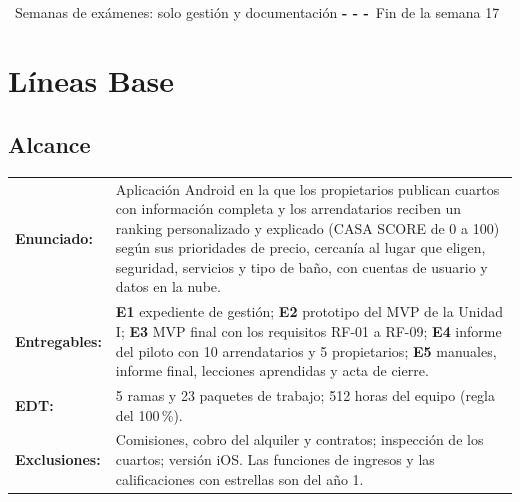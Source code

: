\documentclass[11pt,a4paper]{article}
\begin{document}
\begin{center}
\\[2pt]
{\scriptsize {}~Semanas de exámenes: solo gestión y documentación \quad \textcolor{RaciR}{\textbf{- - -}}~Fin de la semana 17}
\end{center}

\section{Líneas Base}
\subsection{Alcance}
{\small
\noindent\begin{tabularx}{\textwidth}{@{}P{3.0cm} L@{}}
\toprule
\textbf{Enunciado:} & Aplicación Android en la que los propietarios publican cuartos con información completa y los arrendatarios reciben un ranking personalizado y explicado (CASA SCORE de 0 a 100) según sus prioridades de precio, cercanía al lugar que eligen, seguridad, servicios y tipo de baño, con cuentas de usuario y datos en la nube. \\
\textbf{Entregables:} & \textbf{E1} expediente de gestión; \textbf{E2} prototipo del MVP de la Unidad I; \textbf{E3} MVP final con los requisitos RF-01 a RF-09; \textbf{E4} informe del piloto con 10 arrendatarios y 5 propietarios; \textbf{E5} manuales, informe final, lecciones aprendidas y acta de cierre. \\
\textbf{EDT:} & 5 ramas y 23 paquetes de trabajo; 512 horas del equipo (regla del 100\,\%). \\
\textbf{Exclusiones:} & Comisiones, cobro del alquiler y contratos; inspección de los cuartos; versión iOS. Las funciones de ingresos y las calificaciones con estrellas son del año 1. \\
\bottomrule
\end{tabularx}
}
\end{document}
